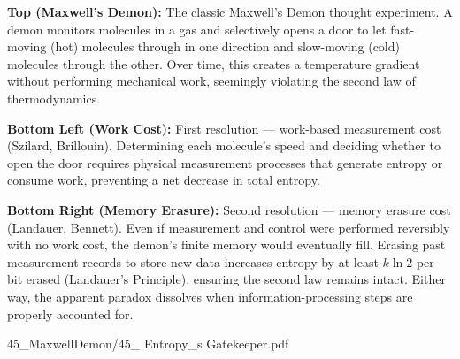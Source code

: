 \begin{SideNotePage}{
  \textbf{Top (Maxwell's Demon):} The classic Maxwell’s Demon thought experiment. A demon monitors molecules in a gas and selectively opens a door to let fast-moving (hot) molecules through in one direction and slow-moving (cold) molecules through the other. Over time, this creates a temperature gradient without performing mechanical work, seemingly violating the second law of thermodynamics. \par
  \textbf{Bottom Left (Work Cost):} First resolution — work-based measurement cost (Szilard, Brillouin). Determining each molecule’s speed and deciding whether to open the door requires physical measurement processes that generate entropy or consume work, preventing a net decrease in total entropy. \par
  \textbf{Bottom Right (Memory Erasure):} Second resolution — memory erasure cost (Landauer, Bennett). Even if measurement and control were performed reversibly with no work cost, the demon’s finite memory would eventually fill. Erasing past measurement records to store new data increases entropy by at least $k \ln 2$ per bit erased (Landauer’s Principle), ensuring the second law remains intact. Either way, the apparent paradox dissolves when information-processing steps are properly accounted for.
}{45_MaxwellDemon/45_ Entropy_s Gatekeeper.pdf}
\end{SideNotePage}
